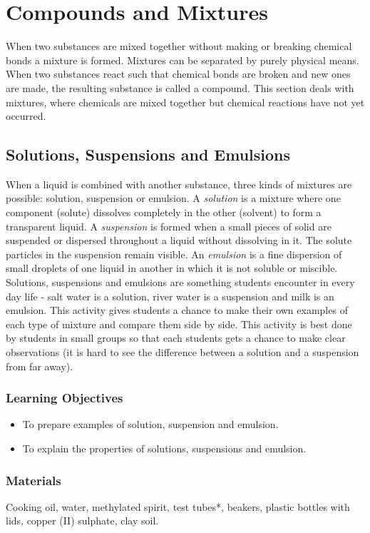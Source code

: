 \section{Compounds and Mixtures}
When two substances are mixed together without making or breaking chemical bonds a mixture is formed. Mixtures can be separated by purely physical means. When two substances react such that chemical bonds are broken and new ones are made, the resulting substance is called a compound. This section deals with mixtures, where chemicals are mixed together but chemical reactions have not yet occurred.

\subsection{Solutions, Suspensions and Emulsions}
When a liquid is combined with another substance, three kinds of mixtures are possible: solution, suspension or emulsion. 
A \textit{solution} is a mixture where one component (solute) dissolves completely in the other (solvent) to form a transparent liquid. A \textit{suspension} is formed when a small pieces of solid are suspended or dispersed throughout a liquid without dissolving in it. The solute particles in the suspension remain visible.  An \textit{emulsion} is a fine dispersion of small droplets of one liquid in another in which it is not soluble or miscible. 
Solutions, suspensions and emulsions are something students encounter in every day life - salt water is a solution, river water is a suspension and milk is an emulsion.
This activity gives students a chance to make their own examples of each type of mixture and compare them side by side. This activity is best done by students in small groups so that each students gets a chance to make clear observations (it is hard to see the difference between a solution and a suspension from far away).

\subsubsection*{Learning Objectives}
\begin{itemize}
\item{To prepare examples of solution, suspension and emulsion.}
\item{To explain the properties of solutions, suspensions and emulsion.}
\end{itemize}

\subsubsection*{Materials}
Cooking oil, water, methylated spirit, test tubes*, beakers, plastic bottles with lids, copper (II) sulphate, clay soil.


